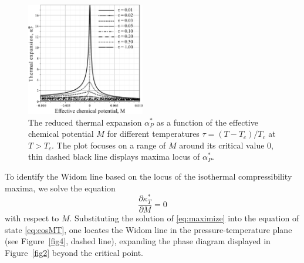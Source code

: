 \begin{figure}[h!] 
	\centering \includegraphics[width=0.46\textwidth]{f3cc.pdf}
	\vskip-3mm
	\caption{The reduced thermal expansion $\alpha^*_P$ as a function of the effective chemical potential $M$ for different temperatures $\tau = (T - T_c)/T_c$ at $T > T_c$. The plot focuses on a range of $M$ around its critical value $0$, thin dashed black line displays maxima locus of $\alpha^*_P$.
	}
	\label{fig3b}
\end{figure}
To identify the Widom line based on the locus of the isothermal compressibility maxima, we solve the equation
\begin{equation}\label{eq:maximize}
	\frac{\partial \kappa_T^*}{\partial M} = 0
\end{equation}
with respect to $M$.
Substituting the solution of \eqref{eq:maximize} into the equation of state \eqref{eq:eosMT}, one locates the Widom line in the pressure-temperature plane (see Figure~\ref{fig4}, dashed line), expanding the phase diagram displayed in Figure~\ref{fig2} beyond the critical point.

